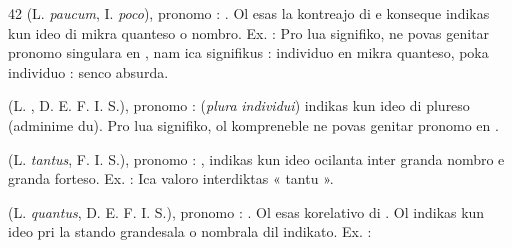 \begin{VUpage}[46]{42}
\VUblancAlinea
{} (L. \textit{paucum}, I. \textit{poco}), pronomo : . Ol esas la\nl
kontreajo di  e konseque indikas kun ideo di mikra\nl
quanteso o nombro. Ex. :  Pro lua\nl
signifiko,  ne povas genitar pronomo singulara en ,\nl
nam ica signifikus : individuo en mikra quanteso, poka\nl
individuo : senco absurda.

\VUblancAlinea
{} (L. , D. E. F. I. S.), pronomo :  (\textit{plura}\nl
\textit{individui}) indikas kun ideo di plureso (adminime du). Pro\nl
lua signifiko, ol kompreneble ne povas genitar pronomo\nl
en .

\VUblancAlinea
{} (L. \textit{tantus}, F. I. S.), pronomo : , indikas kun\nl
ideo ocilanta inter granda nombro e granda forteso. Ex. :\nl
{} Ica valoro interdiktas « tantu ».

\VUblancAlinea
{} (L. \textit{quantus}, D. E. F. I. S.), pronomo : .\nl
Ol esas korelativo di . Ol indikas kun ideo pri la stando\nl
grandesala o nombrala dil indikato. Ex. : 
\parplein
\end{VUpage}

